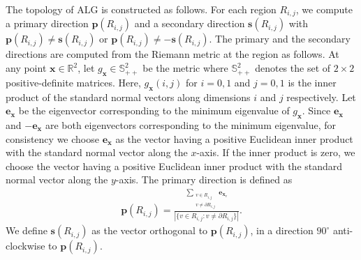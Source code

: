 \documentclass[acmsmall, screen]{acmart}
\begin{document}
The topology of $\mathrm{ALG}$ is constructed as follows. 
For each region $R_{i,j}$, we compute a primary direction $\mathbf{p}(R_{i,j})$ and a secondary direction $\mathbf{s}(R_{i,j})$ with $\mathbf{p}(R_{i,j}) \neq \mathbf{s}(R_{i, j})$ or  $\mathbf{p}(R_{i,j}) \neq -\mathbf{s}(R_{i,j})$. 
The primary and the secondary directions are computed from the Riemann metric at the region as follows.
At any point $\mathbf{x} \in \mathbb{R}^2$, let $g_\mathbf{x} \in \mathbb{S}_{++}^2$ be the metric where $\mathbb{S}_{++}^2$ denotes the set of $2\times 2$ positive-definite matrices. 
Here, $g_\mathbf{x}(i, j)$ for $i=0,1$ and $j=0,1$ is the inner product of the standard normal vectors along dimensions $i$ and $j$ respectively. 
Let $\mathbf{e}_\mathbf{x}$ be the eigenvector corresponding to the minimum eigenvalue of $g_\mathbf{x}$. 
Since $\mathbf{e}_\mathbf{x}$ and $-\mathbf{e}_\mathbf{x}$ are both eigenvectors corresponding to the minimum eigenvalue, for consistency we choose $\mathbf{e}_\mathbf{x}$ as the vector having a positive Euclidean inner product with the standard normal vector along the $x$-axis. 
If the inner product is zero, we choose the vector having a positive Euclidean inner product with the standard normal vector along the $y$-axis. 
The primary direction is defined as 
\begin{align}
\mathbf{p}(R_{i,j}) = \frac{ \sum_{\substack{v \in R_{i,j} \\ v \neq \partial R_{i,j}}} \mathbf{e}_{\mathbf{x}_v}}{ |\{v \in R_{i,j}: v \neq \partial R_{i,j} \}|}. 
\end{align}
We define $\mathbf{s}(R_{i,j}) $ as the vector orthogonal to $\mathbf{p}(R_{i,j})$, in a direction $90^{\circ}$ anti-clockwise to $\mathbf{p}(R_{i,j})$.  
\end{document}
